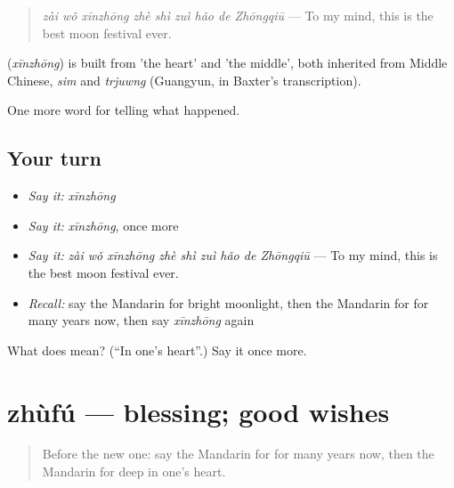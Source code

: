 \begin{quote}
\textbf{} \emph{zài wǒ xīnzhōng zhè shì zuì hǎo de Zhōngqiū} — To my mind, this is the best moon festival ever.
\end{quote}

\begin{cousinweb}
\textbf{} (\emph{xīnzhōng}) is built from  'the heart' and  'the middle', both inherited from Middle Chinese, \emph{sim} and \emph{trjuwng} (Guangyun, in Baxter's transcription).
\end{cousinweb}

\begin{grammarlens}[title={What you've built}]
One more word for telling what happened.
\end{grammarlens}

\subsection*{Your turn}
\begin{itemize}
\raggedright
  \item \emph{Say it:} \emph{xīnzhōng}
  \item \emph{Say it:} \emph{xīnzhōng}, once more
  \item \emph{Say it:} \emph{zài wǒ xīnzhōng zhè shì zuì hǎo de Zhōngqiū} — To my mind, this is the best moon festival ever.
  \item \emph{Recall:} say the Mandarin for bright moonlight, then the Mandarin for for many years now, then say \emph{xīnzhōng} again
\end{itemize}

\begin{tcolorbox}[breakable,colback=teal!4,colframe=teal!35!black,title={Before you move on}]
What does  mean? (\textquotedblleft{}In one's heart\textquotedblright{}.) Say it once more.
\end{tcolorbox}
\section[zhùfú]{zhùfú — blessing; good wishes}

\label{lesson:ZH-C343-zhufu}



\begin{quote}
Before the new one: say the Mandarin for for many years now, then the Mandarin for deep in one's heart.
\end{quote}

